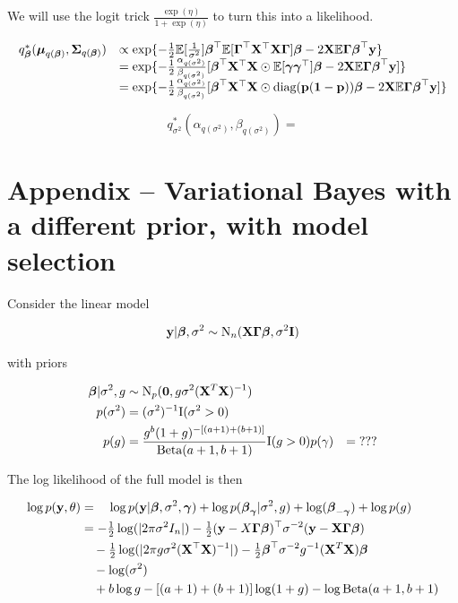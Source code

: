 \documentclass{amsart}[12pt]
\begin{document}
We will use the logit trick $\frac{\exp(\eta)}{1 + \exp(\eta)}$ to turn this into a likelihood.

\begin{equation*}
\begin{array}{rl}
q^*_{\boldsymbol \beta}({\boldsymbol \mu}_{q({\boldsymbol \beta})}, {\boldsymbol \Sigma}_{q({\boldsymbol \beta})}) &\propto \exp \{ -\tfrac{1}{2} \mathbb{E} [\frac{1}{\sigma^2}] {\boldsymbol\beta}^\top \mathbb{E}[ {\boldsymbol \Gamma}^\top {\bf X}^\top {\bf X} {\boldsymbol\Gamma} ] {\boldsymbol\beta} - 2 {\bf X} \mathbb{E} {\boldsymbol \Gamma} {\boldsymbol \beta}^\top {\bf y} \} \\
&= \exp\{ -\tfrac{1}{2} \frac{\alpha_{q(\sigma^2)}}{\beta_{q(\sigma^2)}} [{\boldsymbol \beta}^\top {\bf X}^\top {\bf X} \odot \mathbb{E}[{\boldsymbol \gamma} {\boldsymbol \gamma}^\top] {\boldsymbol\beta} - 2 {\bf X} \mathbb{E} {\boldsymbol \Gamma} {\boldsymbol \beta}^\top {\bf y}] \} \\
&= \exp\{ -\tfrac{1}{2} \frac{\alpha_{q(\sigma^2)}}{\beta_{q(\sigma^2)}} [{\boldsymbol \beta}^\top {\bf X}^\top {\bf X} \odot \text{diag}{({\bf p}({\bf1}- {\bf p}))} {\boldsymbol\beta} - 2 {\bf X} \mathbb{E} {\boldsymbol \Gamma} {\boldsymbol \beta}^\top {\bf y}] \}
\end{array}
\end{equation*}

\begin{equation*}
q^*_{\sigma^2}(\alpha_{q(\sigma^2)}, \beta_{q(\sigma^2)}) = 
\end{equation*}

\section{Appendix -- Variational Bayes with a different prior, with model selection}

Consider the linear model

\begin{align*}
{\bf y} | {\boldsymbol \beta}, \sigma^2 \sim \text{N}_n({\bf X} {\boldsymbol \Gamma} {\boldsymbol \beta}, \sigma^2 {\bf I})
\end{align*}

with priors

\begin{align*}
{\boldsymbol\beta} | \sigma^2, g &\sim \text{N}_p({\bf 0}, g \sigma^2 ({\bf X}^T {\bf X})^{-1}) \\
p(\sigma^2) &= (\sigma^2)^{-1} \text{I}(\sigma^2 > 0) \\
p(g) &= \frac{g^b (1 + g)^{-[(a + 1) + (b + 1)]}}{\text{Beta}(a + 1, b + 1)} \text{I}(g > 0)
p(\gamma) &= \text{???}
\end{align*}

The log likelihood of the full model is then

\begin{align*}
\log p({\bf y}, \theta) &= \quad\log p({\bf y}|{\boldsymbol \beta}, \sigma^2, {\boldsymbol \gamma}) + \log p({\boldsymbol \beta}_{\boldsymbol \gamma} | \sigma^2, g) + \log({\boldsymbol \beta}_{-{\boldsymbol \gamma}}) + \log p(g) \\
&= -\tfrac{1}{2} \log(|2 \pi \sigma^2 I_n|) - \tfrac{1}{2} ({\bf y} - X {\boldsymbol \Gamma} {\boldsymbol \beta})^\top \sigma^{-2} ({\bf y} - {\bf X} {\boldsymbol \Gamma} {\boldsymbol \beta}) \\
&\quad -\tfrac{1}{2} \log(|2 \pi g \sigma^2 ({\bf X}^\top {\bf X})^{-1}|) -\tfrac{1}{2} {\boldsymbol \beta}^\top \sigma^{-2} g^{-1} ({\bf X}^T {\bf X}) {\boldsymbol \beta} \\
&\quad - \log (\sigma^2) \\
&\quad + b \log g - [(a + 1) + (b + 1)] \log (1 + g) - \log \text{Beta}(a + 1, b + 1)
\end{align*}
\end{document}
